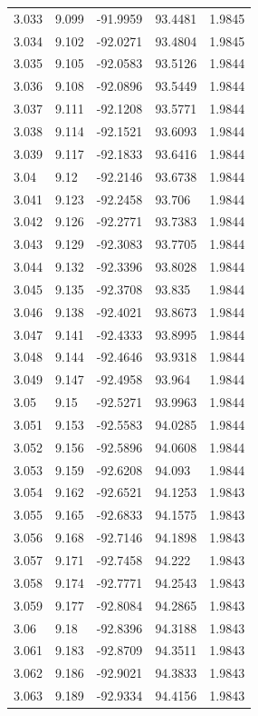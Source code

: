 \begin{tabular}{lllll}
3.033 & 9.099 & -91.9959 & 93.4481 & 1.9845 \\
3.034 & 9.102 & -92.0271 & 93.4804 & 1.9845 \\
3.035 & 9.105 & -92.0583 & 93.5126 & 1.9844 \\
3.036 & 9.108 & -92.0896 & 93.5449 & 1.9844 \\
3.037 & 9.111 & -92.1208 & 93.5771 & 1.9844 \\
3.038 & 9.114 & -92.1521 & 93.6093 & 1.9844 \\
3.039 & 9.117 & -92.1833 & 93.6416 & 1.9844 \\
3.04 & 9.12 & -92.2146 & 93.6738 & 1.9844 \\
3.041 & 9.123 & -92.2458 & 93.706 & 1.9844 \\
3.042 & 9.126 & -92.2771 & 93.7383 & 1.9844 \\
3.043 & 9.129 & -92.3083 & 93.7705 & 1.9844 \\
3.044 & 9.132 & -92.3396 & 93.8028 & 1.9844 \\
3.045 & 9.135 & -92.3708 & 93.835 & 1.9844 \\
3.046 & 9.138 & -92.4021 & 93.8673 & 1.9844 \\
3.047 & 9.141 & -92.4333 & 93.8995 & 1.9844 \\
3.048 & 9.144 & -92.4646 & 93.9318 & 1.9844 \\
3.049 & 9.147 & -92.4958 & 93.964 & 1.9844 \\
3.05 & 9.15 & -92.5271 & 93.9963 & 1.9844 \\
3.051 & 9.153 & -92.5583 & 94.0285 & 1.9844 \\
3.052 & 9.156 & -92.5896 & 94.0608 & 1.9844 \\
3.053 & 9.159 & -92.6208 & 94.093 & 1.9844 \\
3.054 & 9.162 & -92.6521 & 94.1253 & 1.9843 \\
3.055 & 9.165 & -92.6833 & 94.1575 & 1.9843 \\
3.056 & 9.168 & -92.7146 & 94.1898 & 1.9843 \\
3.057 & 9.171 & -92.7458 & 94.222 & 1.9843 \\
3.058 & 9.174 & -92.7771 & 94.2543 & 1.9843 \\
3.059 & 9.177 & -92.8084 & 94.2865 & 1.9843 \\
3.06 & 9.18 & -92.8396 & 94.3188 & 1.9843 \\
3.061 & 9.183 & -92.8709 & 94.3511 & 1.9843 \\
3.062 & 9.186 & -92.9021 & 94.3833 & 1.9843 \\
3.063 & 9.189 & -92.9334 & 94.4156 & 1.9843 \\

\end{tabular}
